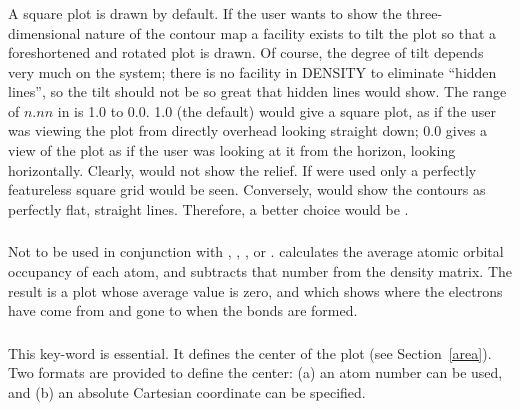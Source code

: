 \subsubsection*{}
A square plot is drawn by default. If the user wants to show the
three-dimensional nature of the contour map a facility exists to tilt the plot
so that a foreshortened and rotated plot is drawn. Of course, the degree of
tilt depends very much on the system; there is no facility in DENSITY to
eliminate ``hidden lines'', so the tilt should not be so great that hidden
lines would show. The range of $n.nn$ in   is 1.0 to 0.0. 1.0
(the default) would give a square plot, as if the user was viewing the plot
from directly overhead looking straight down; 0.0 gives a view of the plot as
if the user was looking at it from the horizon, looking horizontally. Clearly,
 would not show the relief. If  were used only a
perfectly featureless square grid would be seen. Conversely, 
would show the contours as perfectly flat, straight lines. Therefore, a better
choice would be .

\subsubsection*{}
Not to be used in conjunction with , ,
, or .
 calculates the average atomic orbital occupancy of each atom,  and
subtracts that number from the density matrix. The result is a plot whose
average value is zero, and which shows where the electrons have come from and
gone to when the bonds are formed.

\subsubsection*{}
This key-word is essential. It defines the center of the plot (see
Section~\ref{area}). Two formats are provided to define the center: (a) an atom
number can be used, and (b) an absolute Cartesian coordinate  can be specified.

